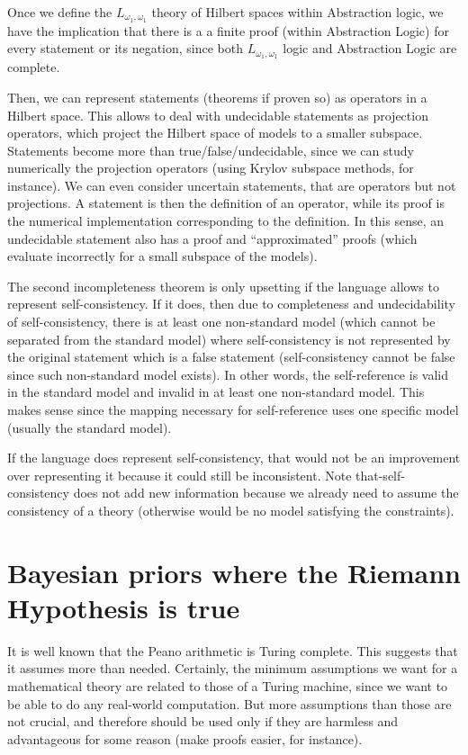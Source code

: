 \documentclass[11pt]{book}
\begin{document}
Once we define the \(L_{\omega_1,\omega_1}\) theory of Hilbert spaces
within Abstraction logic, we have the implication that there is a a
finite proof (within Abstraction Logic) for every statement or its
negation, since both \(L_{\omega_1,\omega_1}\) logic and Abstraction
Logic are complete.

Then, we can represent statements (theorems if proven so) as operators
in a Hilbert space. This allows to deal with undecidable statements as
projection operators, which project the Hilbert space of models to a
smaller subspace. Statements become more than true/false/undecidable,
since we can study numerically the projection operators (using Krylov
subspace methods, for instance). We can even consider uncertain
statements, that are operators but not projections. A statement is then
the definition of an operator, while its proof is the numerical
implementation corresponding to the definition. In this sense, an
undecidable statement also has a proof and ``approximated'' proofs
(which evaluate incorrectly for a small subspace of the models).

The second incompleteness theorem is only upsetting if the language
allows to represent self-consistency. If it does, then due to
completeness and undecidability of self-consistency, there is at least
one non-standard model (which cannot be separated from the standard
model) where self-consistency is not represented by the original
statement which is a false statement (self-consistency cannot be false
since such non-standard model exists). In other words, the
self-reference is valid in the standard model and invalid in at least
one non-standard model. This makes sense since the mapping necessary for
self-reference uses one specific model (usually the standard model).

If the language does represent self-consistency, that would not be an
improvement over representing it because it could still be inconsistent.
Note that-self-consistency does not add new information because we
already need to assume the consistency of a theory (otherwise would be
no model satisfying the constraints).

\hypertarget{bayesian-priors-where-the-riemann-hypothesis-is-true}{%
\section{Bayesian priors where the Riemann Hypothesis is
true}\label{bayesian-priors-where-the-riemann-hypothesis-is-true}}

It is well known that the Peano arithmetic is Turing complete. This
suggests that it assumes more than needed. Certainly, the minimum
assumptions we want for a mathematical theory are related to those of a
Turing machine, since we want to be able to do any real-world
computation. But more assumptions than those are not crucial, and
therefore should be used only if they are harmless and advantageous for
some reason (make proofs easier, for instance).
\end{document}

